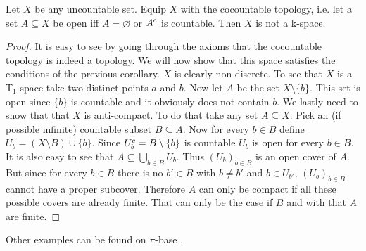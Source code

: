 \begin{example}
    Let $X$ be any uncountable set.
    Equip $X$ with the cocountable topology, i.e. let a set $A \subseteq X$ be open iff $A = \varnothing$ or $A^{c}$ is countable.
    Then $X$ is not a k-space.
\end{example}
\begin{proof}
    It is easy to see by going through the axioms that the cocountable topology is indeed a topology. 
    We will now show that this space satisfies the conditions of the previous corollary.
    $X$ is clearly non-discrete. 
    To see that $X$ is a T$_1$ space take two distinct points $a$ and $b$. 
    Now let $A$ be the set $X\setminus \{b\}$. 
    This set is open since $\{b\}$ is countable and it obviously does not contain $b$. 
    We lastly need to show that that $X$ is anti-compact. 
    To do that take any set $A \subseteq X$.
    Pick an (if possible infinite) countable subset $B \subseteq A$. 
    Now for every $b \in B$ define $U_b = (X \setminus B) \cup \{b\}$.
    Since $U_b^{c} = B \setminus\{b\}$ is countable $U_b$ is open for every $b \in B$.
    It is also easy to see that $A \subseteq \bigcup_{b \in B}U_b$. 
    Thus $(U_b)_{b \in B}$ is an open cover of $A$. 
    But since for every $b \in B$ there is no $b' \in B$ with $b \ne b'$ and $b \in U_{b'}$, $(U_b)_{b \in B}$ cannot have a proper subcover.
    Therefore $A$ can only be compact if all these possible covers are already finite. 
    That can only be the case if $B$ and with that $A$ are finite. 
\end{proof}

Other examples can be found on $\pi$-base \cite{PiBase2024}.
